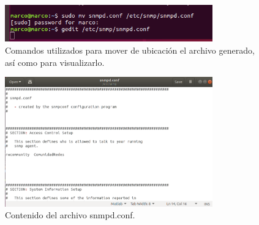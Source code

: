 \begin{figure}[htbp!]
	\centering
		\includegraphics[width=0.8\textwidth]{images/desarrollo/configuracion_linux8.png}
	\caption{Comandos utilizados para mover de ubicación el archivo generado, así como para visualizarlo.}
\end{figure}

\begin{figure}[htbp!]
	\centering
		\includegraphics[width=0.8\textwidth]{images/desarrollo/configuracion_linux9.png}
	\caption{Contenido del archivo snmpd.conf.}
\end{figure}
